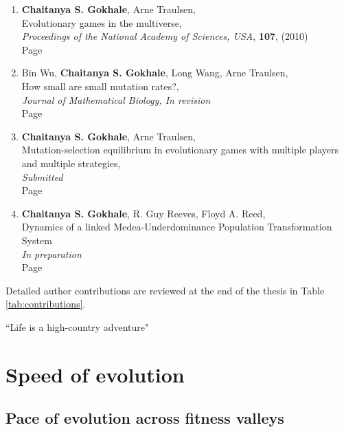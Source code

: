 \documentclass[oneside,11pt,a4paper]{book}
\begin{document}
\begin{enumerate}[4.1]
\item \textbf{Chaitanya S. Gokhale}, Arne Traulsen,\\
  	Evolutionary games in the multiverse,\\
	\textit{Proceedings of the National Academy of Sciences, USA}, \textbf{107}, (2010)\\
	Page \pageref{chap:multiverse}
	
\item Bin Wu, \textbf{Chaitanya S. Gokhale}, Long Wang, Arne Traulsen,\\
  	How small are small mutation rates?,\\
	\textit{Journal of Mathematical Biology, In revision}\\
	Page \pageref{sec:wgt}
	
\item \textbf{Chaitanya S. Gokhale}, Arne Traulsen,\\
	Mutation-selection equilibrium in evolutionary games with multiple players and multiple strategies,\\
	\textit{Submitted}\\
	Page \pageref{sec:equilibrium}

\item \textbf{Chaitanya S. Gokhale}, R. Guy Reeves, Floyd A. Reed,\\
  	Dynamics of a linked Medea-Underdominance Population Transformation System\\
	\textit{In preparation}\\
	Page \pageref{chap:medea}
\end{enumerate}

\noindent
Detailed author contributions are reviewed at the end of the thesis in Table \ref{tab:contributions}.



\begin{savequote}[13pc]
\sffamily
``Life is a high-country adventure"
\end{savequote}

\chapter{Speed of evolution}
\label{chap:speed}

\section{Pace of evolution across fitness valleys}
\graphicspath{{Figs_Pace/}{Figs_Pace/}{Figs_Pace/}}
\end{document}
